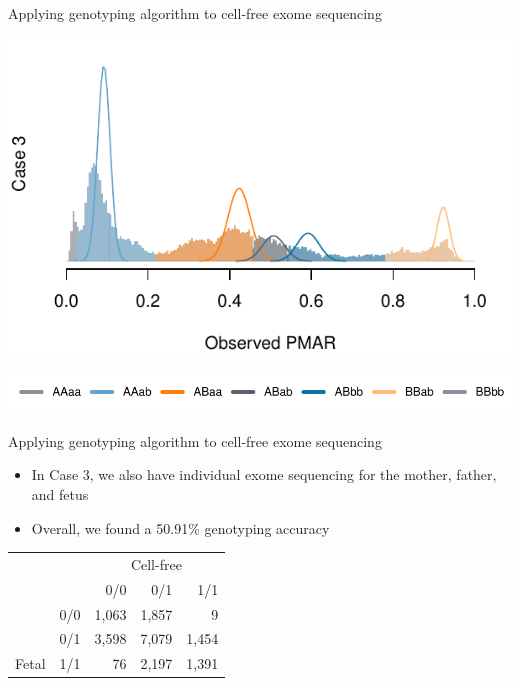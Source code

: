 \documentclass[
  10pt,
  ignorenonframetext,
  m]{beamer}
\begin{document}
\begin{frame}{Applying genotyping algorithm to cell-free exome
sequencing}
\protect\hypertarget{applying-genotyping-algorithm-to-cell-free-exome-sequencing-3}{}

\begin{center}\includegraphics{defense_files/figure-beamer/alleleDepCase3-1} \end{center}

\centering \includegraphics{defense_files/figure-beamer/genoLgnd-1.pdf}

\end{frame}

\begin{frame}{Applying genotyping algorithm to cell-free exome
sequencing}
\protect\hypertarget{applying-genotyping-algorithm-to-cell-free-exome-sequencing-4}{}

\begin{itemize}
\item
  In Case 3, we also have individual exome sequencing for the mother,
  father, and fetus
\item
  Overall, we found a 50.91\% genotyping accuracy
\end{itemize}

\bigskip

\begin{table}[H]
\centering
\begin{tabular}{llrrr}
\toprule
\multicolumn{2}{c}{ } & \multicolumn{3}{c}{Cell-free} \\
\cmidrule(l{3pt}r{3pt}){3-5}
  &   & 0/0 & 0/1 & 1/1\\
\midrule
 & 0/0 & 1,063 & 1,857 & 9\\
\cmidrule{2-5}
 & 0/1 & 3,598 & 7,079 & 1,454\\
\cmidrule{2-5}
\multirow{-3}{*}{\raggedright\arraybackslash Fetal} & 1/1 & 76 & 2,197 & 1,391\\
\bottomrule
\end{tabular}
\end{table}

\end{frame}
\end{document}
